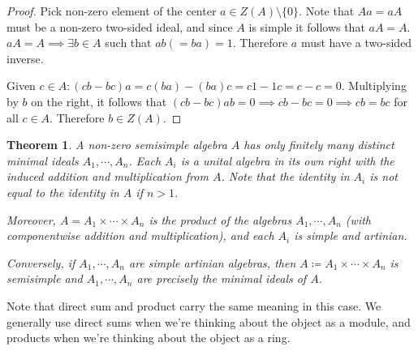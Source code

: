 \documentclass{article}
\theoremstyle{definition}
\theoremstyle{plain}
\newtheorem{theorem}{Theorem}[section]
\theoremstyle{remark}
\begin{document}
    \begin{proof}
        Pick non-zero element of the center \(a\in Z(A) \setminus \{ 0 \}\). Note that \(Aa=aA\) must be a non-zero two-sided ideal, and since \(A\) is simple it follows that \(aA = A\). \(aA = A \implies \exists b\in A\) such that \(ab (=ba) = 1\). Therefore \(a\) must have a two-sided inverse.

        Given \(c\in A: (cb - bc) a = c(ba) - (ba) c = c1 - 1c = c-c = 0\). Multiplying by \(b\) on the right, it follows that \((cb - bc) ab = 0 \implies cb - bc = 0  \implies cb = bc\) for all \(c\in A\). Therefore \(b\in Z(A)\).
    \end{proof}


    \begin{theorem}
        A non-zero semisimple algebra \(A\) has only finitely many distinct minimal ideals \(A_1, \cdots , A_n\). Each \(A_i\) is a unital algebra in its own right with the induced addition and multiplication from \(A\). Note that the identity in \(A_i\) is not equal to the identity in \(A\) if \(n > 1\).

        Moreover, \(A = A_1 \times \cdots \times A_n\) is the product of the algebras \(A_1 , \cdots , A_n\) (with componentwise addition and multiplication), and each \(A_i\) is simple and artinian.

        Conversely, if \(A_1 , \cdots , A_n\) are simple artinian algebras, then \(A \coloneqq A_1 \times \cdots \times A_n\) is semisimple and \(A_1, \cdots , A_n\) are precisely the minimal ideals of \(A\).
    \end{theorem}

    Note that direct sum and product carry the same meaning in this case. We generally use direct sums when we're thinking about the object as a module, and products when we're thinking about the object as a ring.
\end{document}
